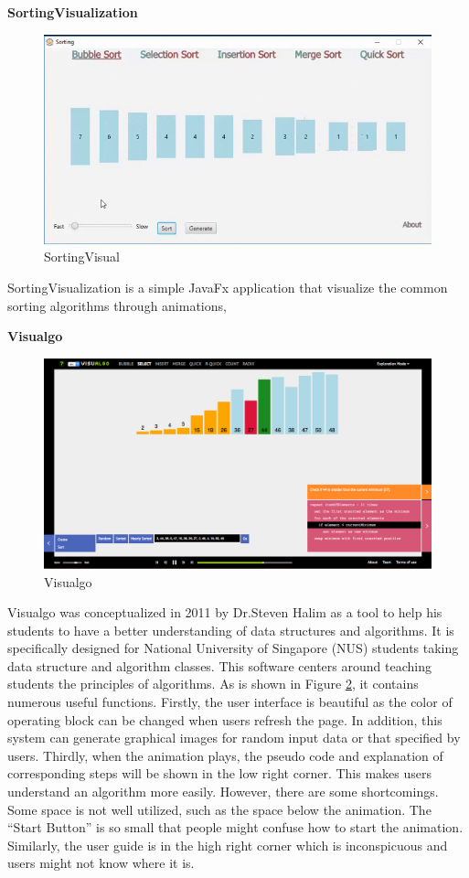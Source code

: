 \documentclass[paper=a4, fontsize=11pt,twoside]{scrartcl}		%
\begin{document}
\textbf{SortingVisualization}
\begin{figure}[htbp]
    \centering
    \includegraphics[width=.8\textwidth]{SortingVisual.png}
    \caption{SortingVisual}
    \label{fig:sortingVisual}
\end{figure}

SortingVisualization is a simple JavaFx application that visualize the common sorting algorithms through animations, 


\textbf{Visualgo}\\
\begin{figure}[htbp]
\centering
\includegraphics[width=.8\textwidth]{Visualgo.png}
\caption{Visualgo}
\label{Visualgo}
\end{figure}

Visualgo was conceptualized in 2011 by Dr.Steven Halim as a tool to help his students to have a better understanding of data structures and algorithms. It is specifically designed for National University of Singapore (NUS) students taking data structure and algorithm classes. This software centers around teaching students the principles of algorithms. As is shown in Figure \ref{Visualgo}, it contains numerous useful functions. Firstly, the user interface is beautiful as the color of operating block can be changed when users refresh the page. In addition, this system can generate graphical images for random input data or that specified by users. Thirdly, when the animation plays, the pseudo code and explanation of corresponding steps will be shown in the low right corner. This makes users understand an algorithm more easily. However, there are some shortcomings. Some space is not well utilized, such as the space below the animation. The ``Start Button'' is so small that people might confuse how to start the animation. Similarly, the user guide is in the high right corner which is inconspicuous and users might not know where it is.\\ \\
\end{document}

